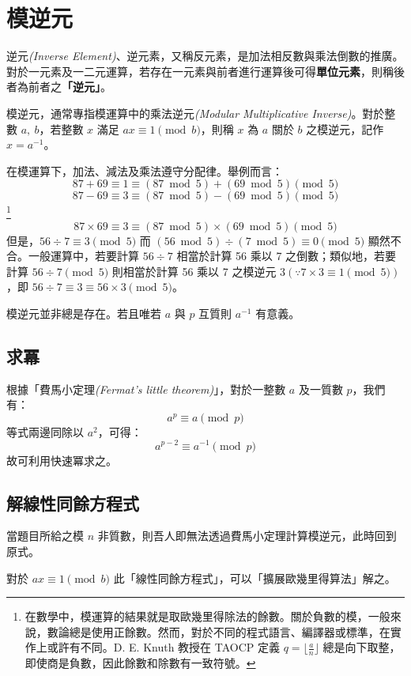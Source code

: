 \documentclass[12pt, a4paper]{article}
\begin{document}
\section{模逆元}

逆元\textit{(Inverse Element)}、逆元素，又稱反元素，是加法相反數與乘法倒數的推廣。對於一元素及一二元運算，若存在一元素與前者進行運算後可得\textbf{單位元素}，則稱後者為前者之\textbf{「逆元」}。

模逆元，通常專指模運算中的乘法逆元\textit{(Modular Multiplicative Inverse)}。對於整數 $a,\ b$，若整數 $x$ 滿足 $ax \equiv 1 \pmod b$，則稱 $x$ 為 $a$ 關於 $b$ 之模逆元，記作 $x = a^{-1}$。

在模運算下，加法、減法及乘法遵守分配律。舉例而言：\[87 + 69 \equiv 1 \equiv (87 \bmod 5) + (69 \bmod 5) \pmod 5\]\[87 - 69 \equiv 3 \equiv (87 \bmod 5) - (69 \bmod 5) \pmod 5\]\footnote{在數學中，模運算的結果就是取歐幾里得除法的餘數。關於負數的模，一般來說，數論總是使用正餘數。然而，對於不同的程式語言、編譯器或標準，在實作上或許有不同。D. E. Knuth 教授在 TAOCP 定義 $q = \lfloor\frac{a}{n}\rfloor$ 總是向下取整，即使商是負數，因此餘數和除數有一致符號。}\[87 \times 69 \equiv 3 \equiv (87 \bmod 5) \times (69 \bmod 5) \pmod 5\] 但是，$56 \div 7 \equiv 3 \pmod 5$ 而 $(56 \bmod 5) \div (7 \bmod 5) \equiv 0 \pmod 5$ 顯然不合。一般運算中，若要計算 $56 \div 7$ 相當於計算 56 乘以 7 之倒數；類似地，若要計算 $56 \div 7 \pmod 5$ 則相當於計算 56 乘以 7 之模逆元 3$(\because  7 \times 3 \equiv 1 \pmod 5)$，即 $56 \div 7 \equiv 3 \equiv 56 \times 3 \pmod 5$。

模逆元並非總是存在。若且唯若 $a$ 與 $p$ 互質則 $a^{-1}$ 有意義。

\subsection{求冪}

根據「費馬小定理\textit{(Fermat's little theorem)}」，對於一整數 $a$ 及一質數 $p$，我們有：
\[a^p \equiv a \pmod p\]
等式兩邊同除以 $a^2$，可得：
\[a^{p-2} \equiv a^{-1} \pmod p\]
故可利用快速冪求之。

\subsection{解線性同餘方程式}

當題目所給之模 $n$ 非質數，則吾人即無法透過費馬小定理計算模逆元，此時回到原式。

對於 $ax \equiv 1 \pmod b$ 此「線性同餘方程式」，可以「擴展歐幾里得算法」解之。
\end{document}
